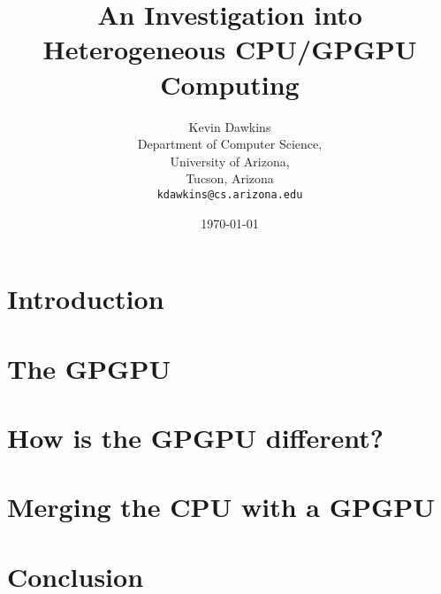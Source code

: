 \documentclass[12pt,notitlepage]{report}
\begin{document}
\setcounter{tocdepth}{4}

\title{An Investigation into Heterogeneous CPU/GPGPU Computing}
\author{Kevin Dawkins\\
  Department of Computer Science,\\
  University of Arizona,\\
  Tucson, Arizona\\
  \texttt{kdawkins@cs.arizona.edu}}
\date{\today}
\maketitle



\tableofcontents

\chapter*{Introduction}


\chapter*{The GPGPU}


\chapter*{How is the GPGPU different?}


\chapter*{Merging the CPU with a GPGPU}


\chapter*{Conclusion}


\nocite{nvidia, mapreduce, cpuassist}



\end{document}
